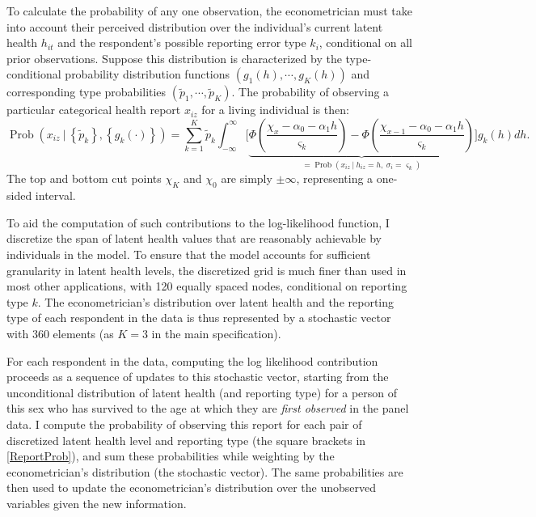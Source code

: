\documentclass[12pt,pdftex,letterpaper]{article}
\newcommand{\Prob}{\operatorname{Prob}}
\newcommand{\Health}{h}
\newcommand{\Report}{x}
\newcommand{\Cut}{\chi}
\newcommand{\LatentParam}{\alpha}
\newcommand{\TypeProb}{p}
\newcommand{\TypeProbPcvd}{\widetilde{\TypeProb}}
\newcommand{\ReportStd}{\varsigma}
\begin{document}
To calculate the probability of any one observation, the econometrician must take into account their perceived distribution over the individual's current latent health $\Health_{it}$ and the respondent's possible reporting error type $k_i$, conditional on all prior observations. Suppose this distribution is characterized by the type-conditional probability distribution functions $(g_1(\Health), \cdots, g_K(\Health))$ and corresponding type probabilities $(\TypeProbPcvd_1,\cdots, \TypeProbPcvd_K)$. The probability of observing a particular categorical health report $\Report_{iz}$ for a living individual is then:
\begin{equation}\label{ReportProb}
\Prob \left( \Report_{iz} ~\big|~ \left\{\TypeProbPcvd_k \right\}, \left\{g_k(\cdot) \right\} \right) = \sum_{k=1}^K \TypeProbPcvd_k \int_{-\infty}^{\infty} \bigg[ \underbrace{\Phi \left(\frac{\Cut_{\Report} - \LatentParam_0 - \LatentParam_1 \Health}{\ReportStd_k} \right) - \Phi \left(\frac{\Cut_{\Report-1} - \LatentParam_0 - \LatentParam_1 \Health}{\ReportStd_k} \right)}_{= \Prob(\Report_{iz} ~|~ \Health_{iz} = \Health, ~ \sigma_i=\ReportStd_k)} \bigg]  g_k(\Health) d \Health.
\end{equation}
The top and bottom cut points $\Cut_K$ and $\Cut_0$ are simply $\pm \infty$, representing a one-sided interval.

To aid the computation of such contributions to the log-likelihood function, I discretize the span of latent health values that are reasonably achievable by individuals in the model. To ensure that the model accounts for sufficient granularity in latent health levels, the discretized grid is much finer than used in most other applications, with 120 equally spaced nodes, conditional on reporting type $k$. The econometrician's distribution over latent health and the reporting type of each respondent in the data is thus represented by a stochastic vector with 360 elements (as $K=3$ in the main specification).

For each respondent in the data, computing the log likelihood contribution proceeds as a sequence of updates to this stochastic vector, starting from the unconditional distribution of latent health (and reporting type) for a person of this sex who has survived to the age at which they are \textit {first observed} in the panel data. I compute the probability of observing this report for each pair of discretized latent health level and reporting type (the square brackets in \eqref{ReportProb}), and sum these probabilities while weighting by the econometrician's distribution (the stochastic vector). The same probabilities are then used to update the econometrician's distribution over the unobserved variables given the new information.
\end{document}

